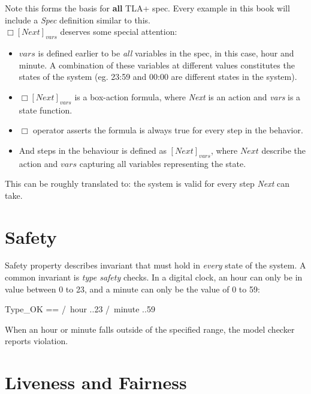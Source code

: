Note this forms the basis for \textbf{all} TLA+ spec. Every example in this book
will include a \textit{Spec} definition similar to this.\\

$\Box[Next]_{vars}$ deserves some special attention:
\begin{itemize}
    \item $vars$ is defined earlier to be \textit{all} variables in the spec, in
    this case, hour and minute. A combination of these variables at different
    values constitutes the states of the system (eg. 23:59 and 00:00 are different states in the system).
    \item $\Box[Next]_{vars}$ is a box-action formula, where \textit{Next} is an
    action and \textit{vars} is a state function.
    \item $\Box$ operator asserts the formula is always true for every step in the behavior.
    \item And steps in the behaviour is defined as $[Next]_{vars}$, where $Next$
    describe the action and $vars$ capturing all variables representing the state.
\end{itemize}

This can be roughly translated to: the system is valid for every step
\textit{Next} can take.

\section{Safety}

Safety property describes invariant that must hold in \textit{every} state
of the system. A common invariant is \textit{type safety} checks. In a digital
clock, an hour can only be in value between 0 to 23, and a minute can only be the value
of 0 to 59:\newline

\begin{tla}
    Type_OK == 
        /\ hour ..23
        /\ minute ..59
\end{tla}
\begin{tlatex}
%
%
%
\end{tlatex}
\newline

When an hour or minute falls outside of the specified range, the model checker 
reports violation.

\section{Liveness and Fairness}

